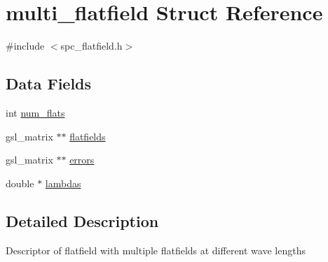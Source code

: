 \hypertarget{structmulti__flatfield}{
\section{multi\_\-flatfield Struct Reference}
\label{structmulti__flatfield}
}


{\ttfamily \#include $<$spc\_\-flatfield.h$>$}\subsection*{Data Fields}
\begin{DoxyCompactItemize}
\item 
int \hyperlink{structmulti__flatfield_a1445b447b76505577b98dead719a86b7}{num\_\-flats}
\item 
gsl\_\-matrix $\ast$$\ast$ \hyperlink{structmulti__flatfield_ac18df4cfe74dac5ef4ae036ffc24bddd}{flatfields}
\item 
gsl\_\-matrix $\ast$$\ast$ \hyperlink{structmulti__flatfield_a524bb3759060a0ac556ab8d6b1e0f146}{errors}
\item 
double $\ast$ \hyperlink{structmulti__flatfield_a174bf56a945c6149cb95ba3bcc2fcea7}{lambdas}
\end{DoxyCompactItemize}


\subsection{Detailed Description}
Descriptor of flatfield with multiple flatfields at different wave lengths 

